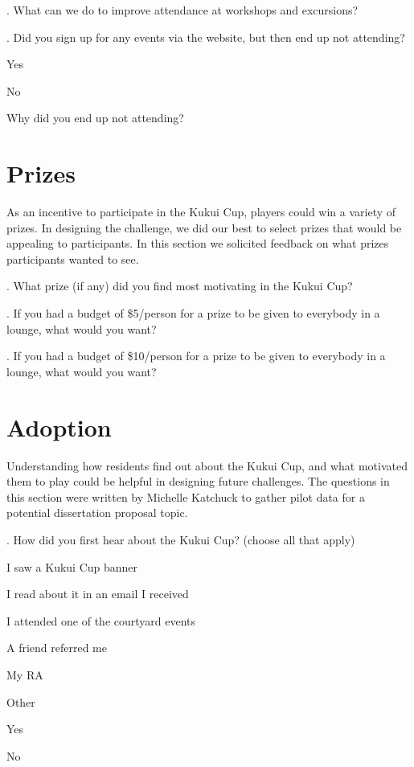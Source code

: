 \vspace{5 mm}
. What can we do to improve attendance at workshops and excursions?

\vspace{5 mm}
. Did you sign up for any events via the website, but then end up not attending?

\begin{radiobutton}
	\item Yes
	\item No
\end{radiobutton}

\noindent
[If No] Why did you end up not attending?


\section{Prizes}

As an incentive to participate in the Kukui Cup, players could win a variety of prizes. In designing the challenge, we did our best to select prizes that would be appealing to participants. In this section we solicited feedback on what prizes participants wanted to see.

\vspace{5 mm}
. What prize (if any) did you find most motivating in the Kukui Cup?

\vspace{5 mm}
. If you had a budget of \$5/person for a prize to be given to everybody in a lounge, what would you want?

\vspace{5 mm}
. If you had a budget of \$10/person for a prize to be given to everybody in a lounge, what would you want?


\section{Adoption}

Understanding how residents find out about the Kukui Cup, and what motivated them to play could be helpful in designing future challenges. The questions in this section were written by Michelle Katchuck to gather pilot data for a potential dissertation proposal topic.

\vspace{5 mm}
. How did you first hear about the Kukui Cup? (choose all that apply)

\begin{checkbox}
	\item I saw a Kukui Cup banner
	\item I read about it in an email I received
	\item I attended one of the courtyard events
	\item A friend referred me
	\item My RA
	\item Other
	\item Yes
	\item No
\end{checkbox}

